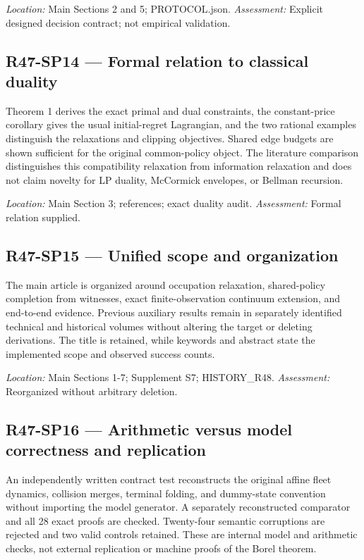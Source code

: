 \noindent\emph{Location:} Main Sections 2 and 5; PROTOCOL.json. \emph{Assessment:} Explicit designed decision contract; not empirical validation.

\subsection{R47-SP14 --- Formal relation to classical duality}
Theorem 1 derives the exact primal and dual constraints, the constant-price corollary gives the usual initial-regret Lagrangian, and the two rational examples distinguish the relaxations and clipping objectives. Shared edge budgets are shown sufficient for the original common-policy object. The literature comparison distinguishes this compatibility relaxation from information relaxation and does not claim novelty for LP duality, McCormick envelopes, or Bellman recursion.

\noindent\emph{Location:} Main Section 3; references; exact duality audit. \emph{Assessment:} Formal relation supplied.

\subsection{R47-SP15 --- Unified scope and organization}
The main article is organized around occupation relaxation, shared-policy completion from witnesses, exact finite-observation continuum extension, and end-to-end evidence. Previous auxiliary results remain in separately identified technical and historical volumes without altering the target or deleting derivations. The title is retained, while keywords and abstract state the implemented scope and observed success counts.

\noindent\emph{Location:} Main Sections 1-7; Supplement S7; HISTORY\_R48. \emph{Assessment:} Reorganized without arbitrary deletion.

\subsection{R47-SP16 --- Arithmetic versus model correctness and replication}
An independently written contract test reconstructs the original affine fleet dynamics, collision merges, terminal folding, and dummy-state convention without importing the model generator. A separately reconstructed comparator and all 28 exact proofs are checked. Twenty-four semantic corruptions are rejected and two valid controls retained. These are internal model and arithmetic checks, not external replication or machine proofs of the Borel theorem.

